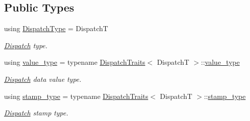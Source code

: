 \subsection*{Public Types}
\begin{DoxyCompactItemize}
\item 
\mbox{\label{structflow_1_1_captor_traits_from_dispatch_ab3ddf1794ab17bba478c020421d0ecb8}} 
using \hyperlink{structflow_1_1_captor_traits_from_dispatch_ab3ddf1794ab17bba478c020421d0ecb8}{Dispatch\+Type} = DispatchT
\begin{DoxyCompactList}\small\item\em \hyperlink{classflow_1_1_dispatch}{Dispatch} type. \end{DoxyCompactList}\item 
\mbox{\label{structflow_1_1_captor_traits_from_dispatch_af9993a1c4d01b2884eef0f74720149b4}} 
using \hyperlink{structflow_1_1_captor_traits_from_dispatch_af9993a1c4d01b2884eef0f74720149b4}{value\+\_\+type} = typename \hyperlink{structflow_1_1_dispatch_traits}{Dispatch\+Traits}$<$ DispatchT $>$\+::\hyperlink{structflow_1_1_captor_traits_from_dispatch_af9993a1c4d01b2884eef0f74720149b4}{value\+\_\+type}
\begin{DoxyCompactList}\small\item\em \hyperlink{classflow_1_1_dispatch}{Dispatch} data value type. \end{DoxyCompactList}\item 
\mbox{\label{structflow_1_1_captor_traits_from_dispatch_a33d283d578e545b1ce4c6c51b0b270f1}} 
using \hyperlink{structflow_1_1_captor_traits_from_dispatch_a33d283d578e545b1ce4c6c51b0b270f1}{stamp\+\_\+type} = typename \hyperlink{structflow_1_1_dispatch_traits}{Dispatch\+Traits}$<$ DispatchT $>$\+::\hyperlink{structflow_1_1_captor_traits_from_dispatch_a33d283d578e545b1ce4c6c51b0b270f1}{stamp\+\_\+type}
\begin{DoxyCompactList}\small\item\em \hyperlink{classflow_1_1_dispatch}{Dispatch} stamp type. \end{DoxyCompactList}\item 
\mbox{\label{structflow_1_1_captor_traits_from_dispatch_a230ae2724dc491631b2e6806113b72b0}} 

\end{DoxyCompactItemize}

